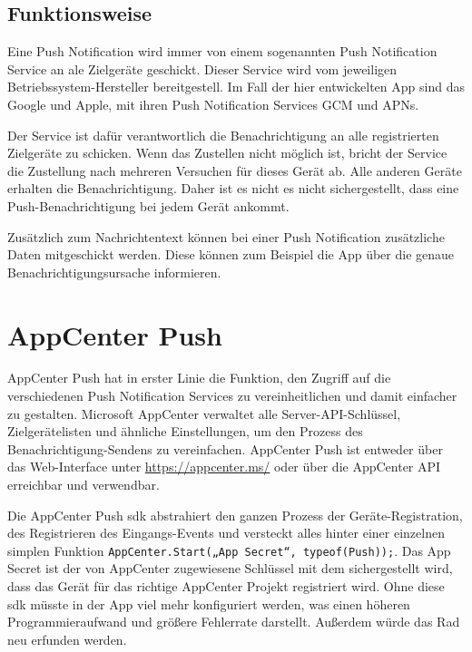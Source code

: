 \subsection{Funktionsweise}
Eine Push Notification wird immer von einem sogenannten Push Notification Service an ale Zielgeräte geschickt.
Dieser Service wird vom jeweiligen Betriebssystem-Hersteller bereitgestell.
Im Fall der hier entwickelten App sind das Google und Apple, mit ihren Push Notification Services GCM und APNs.\par

Der Service ist dafür verantwortlich die Benachrichtigung an alle registrierten Zielgeräte zu schicken.
Wenn das Zustellen nicht möglich ist, bricht der Service die Zustellung nach mehreren Versuchen für dieses Gerät ab.
Alle anderen Geräte erhalten die Benachrichtigung.
Daher ist es nicht es nicht sichergestellt, dass eine Push-Benachrichtigung bei jedem Gerät ankommt.\par

Zusätzlich zum Nachrichtentext können bei einer Push Notification zusätzliche Daten mitgeschickt werden. Diese können zum Beispiel die App über die genaue Benachrichtigungsursache informieren.

\section{AppCenter Push}
AppCenter Push hat in erster Linie die Funktion, den Zugriff auf die verschiedenen Push Notification Services zu vereinheitlichen und damit einfacher zu gestalten.
Microsoft AppCenter verwaltet alle Server-API-Schlüssel, Zielgerätelisten und ähnliche Einstellungen, um den Prozess des Benachrichtigung-Sendens zu vereinfachen.
AppCenter Push ist entweder über das Web-Interface unter \url{https://appcenter.ms/} oder über die AppCenter API erreichbar und verwendbar.\par

Die AppCenter Push \acs{sdk} abstrahiert den ganzen Prozess der Geräte-Registration, des Registrieren des Eingangs-Events und versteckt alles hinter einer einzelnen simplen Funktion \texttt{AppCenter.Start(„{App Secret}“, typeof(Push));}. Das App Secret ist der von AppCenter zugewiesene Schlüssel mit dem sichergestellt wird, dass das Gerät für das richtige AppCenter Projekt registriert wird.
Ohne diese \acs{sdk} müsste in der App viel mehr konfiguriert werden, was einen höheren Programmieraufwand und größere Fehlerrate darstellt. Außerdem würde das Rad neu erfunden werden.\par


